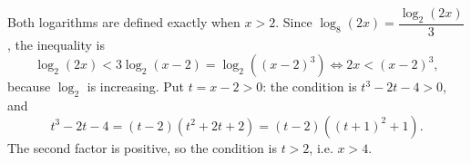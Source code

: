 Both logarithms are defined exactly when $x>2$. Since $\log_8(2x)=\dfrac{\log_2(2x)}{3}$, the inequality is
\[\log_2(2x)<3\log_2(x-2)=\log_2\left((x-2)^3\right)\iff2x<(x-2)^3,\]
because $\log_2$ is increasing. Put $t=x-2>0$: the condition is $t^3-2t-4>0$, and
\[t^3-2t-4=(t-2)\left(t^2+2t+2\right)=(t-2)\left((t+1)^2+1\right).\]
The second factor is positive, so the condition is $t>2$, i.e. $\boxed{x>4}$.
